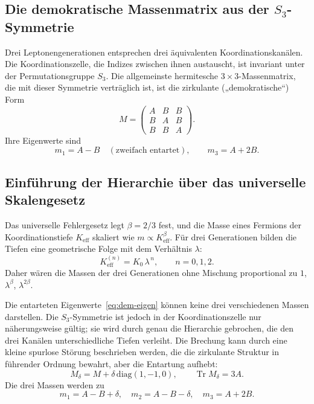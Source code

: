 \documentclass[11pt,a4paper]{article}
\theoremstyle{remark}
\begin{document}
	\subsection{Die demokratische Massenmatrix aus der \(S_3\)-Symmetrie}
	
	Drei Leptonengenerationen entsprechen drei äquivalenten Koordinationskanälen. Die Koordinationszelle, die Indizes zwischen ihnen austauscht, ist invariant unter der Permutationsgruppe \(S_3\). Die allgemeinste hermitesche \(3\times3\)-Massenmatrix, die mit dieser Symmetrie verträglich ist, ist die zirkulante („demokratische“) Form
	\begin{equation}
		M = \begin{pmatrix}
			A & B & B \\
			B & A & B \\
			B & B & A
		\end{pmatrix}.
		\label{eq:democratic}
	\end{equation}
	Ihre Eigenwerte sind
	\begin{equation}
		m_1 = A - B \quad (\text{zweifach entartet}), \qquad
		m_3 = A + 2B .
		\label{eq:dem-eigen}
	\end{equation}
	
	\subsection{Einführung der Hierarchie über das universelle Skalengesetz}
	
	Das universelle Fehlergesetz legt \(\beta = 2/3\) fest, und die Masse eines Fermions der Koordinationstiefe \(K_{\mathrm{eff}}\) skaliert wie \(m \propto K_{\mathrm{eff}}^{\beta}\). Für drei Generationen bilden die Tiefen eine geometrische Folge mit dem Verhältnis \(\lambda\):
	\[
	K_{\mathrm{eff}}^{(n)} = K_0 \, \lambda^{\,n}, \qquad n = 0,1,2 .
	\]
	Daher wären die Massen der drei Generationen ohne Mischung proportional zu \(1\), \(\lambda^{\beta}\), \(\lambda^{2\beta}\).
	
	Die entarteten Eigenwerte~\eqref{eq:dem-eigen} können keine drei verschiedenen Massen darstellen. Die \(S_3\)-Symmetrie ist jedoch in der Koordinationszelle nur näherungsweise gültig; sie wird durch genau die Hierarchie gebrochen, die den drei Kanälen unterschiedliche Tiefen verleiht. Die Brechung kann durch eine kleine spurlose Störung beschrieben werden, die die zirkulante Struktur in führender Ordnung bewahrt, aber die Entartung aufhebt:
	\begin{equation}
		M_\delta = M + \delta \,\mathrm{diag}(1,-1,0), \qquad \operatorname{Tr} M_\delta = 3A .
	\end{equation}
	Die drei Massen werden zu
	\begin{equation}
		m_1 = A - B + \delta, \quad
		m_2 = A - B - \delta, \quad
		m_3 = A + 2B .
		\label{eq:three-masses}
	\end{equation}
	
\end{document}
